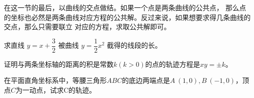 在这一节的最后，以曲线的交点做结。如果一个点是两条曲线的公共点，
那么点的坐标也必然是两条曲线对应方程的公共解。反过来说，如果想要求得几条曲线的交点，那么只需要联立
对应的方程，求取公共解即可。
\begin{example}
    求直线 $ y=x+\dfrac{3}{2} $ 被曲线  $y=\dfrac{1}{2} x^{2}$  截得的线段的长。
\end{example}
\begin{jie}
    
\end{jie}
\clearpage
\review
\clearpage
\hw
\begin{homework}
    证明与两条坐标轴的距离的积是常数$k(k>0)$的点的轨迹方程是$xy=\pm k$。
\end{homework}
\begin{homework}
    在平面直角坐标系中，等腰三角形\(ABC\)的底边两端点是\(A\ (1,0),B\ (-1,0)\)，顶点\(C\)为一动点，试求C的轨迹。
\end{homework}
\clearpage
